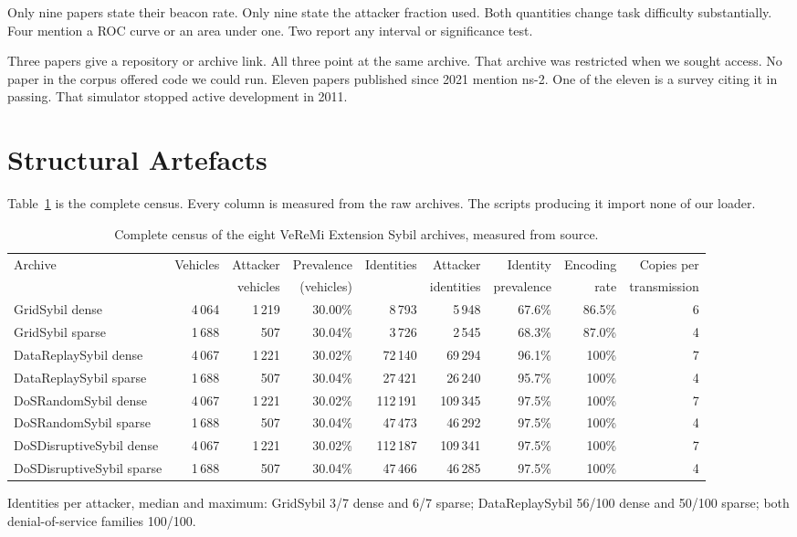 \documentclass[conference]{IEEEtran}
\begin{document}
Only nine papers state their beacon rate.
Only nine state the attacker fraction used.
Both quantities change task difficulty substantially.
Four mention a ROC curve or an area under one.
Two report any interval or significance test.

Three papers give a repository or archive link.
All three point at the same archive.
That archive was restricted when we sought access.
No paper in the corpus offered code we could run.
Eleven papers published since 2021 mention ns-2.
One of the eleven is a survey citing it in passing.
That simulator stopped active development in 2011.

\section{Structural Artefacts}

Table~\ref{tab:census} is the complete census.
Every column is measured from the raw archives.
The scripts producing it import none of our loader.

\begin{table}[t]
\caption{Complete census of the eight VeReMi Extension Sybil archives, measured from source.}
\label{tab:census}
\centering
\footnotesize
\begin{tabular}{lrrrrrrrr}
\toprule
Archive & Vehicles & Attacker & Prevalence & Identities & Attacker & Identity & Encoding & Copies per \\
        &          & vehicles & (vehicles) &            & identities & prevalence & rate & transmission \\
\midrule
GridSybil dense            & 4\,064 & 1\,219 & 30.00\% & 8\,793   & 5\,948   & 67.6\% & 86.5\% & 6 \\
GridSybil sparse           & 1\,688 & 507    & 30.04\% & 3\,726   & 2\,545   & 68.3\% & 87.0\% & 4 \\
DataReplaySybil dense      & 4\,067 & 1\,221 & 30.02\% & 72\,140  & 69\,294  & 96.1\% & 100\%  & 7 \\
DataReplaySybil sparse     & 1\,688 & 507    & 30.04\% & 27\,421  & 26\,240  & 95.7\% & 100\%  & 4 \\
DoSRandomSybil dense       & 4\,067 & 1\,221 & 30.02\% & 112\,191 & 109\,345 & 97.5\% & 100\%  & 7 \\
DoSRandomSybil sparse      & 1\,688 & 507    & 30.04\% & 47\,473  & 46\,292  & 97.5\% & 100\%  & 4 \\
DoSDisruptiveSybil dense   & 4\,067 & 1\,221 & 30.02\% & 112\,187 & 109\,341 & 97.5\% & 100\%  & 7 \\
DoSDisruptiveSybil sparse  & 1\,688 & 507    & 30.04\% & 47\,466  & 46\,285  & 97.5\% & 100\%  & 4 \\
\bottomrule
\end{tabular}

\vspace{2pt}
\footnotesize Identities per attacker, median and maximum: GridSybil 3/7 dense and 6/7 sparse;
DataReplaySybil 56/100 dense and 50/100 sparse; both denial-of-service families 100/100.
\end{table}
\end{document}
